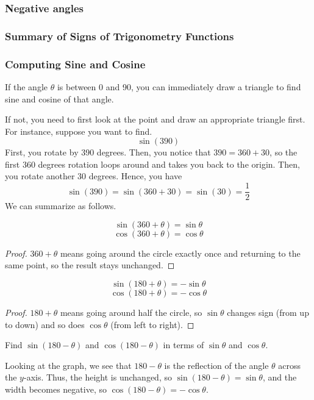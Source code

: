 \begin{frame}
\frametitle{Negative angles}
\end{frame}

\begin{frame}
\frametitle{Summary of Signs of Trigonometry Functions}
\end{frame}

\begin{frame}
\frametitle{Computing Sine and Cosine}
If the angle $\theta$ is between 0 and 90, you can immediately draw a triangle to find sine and cosine of that angle. 
\medskip

If not, you need to first look at the point and draw an appropriate triangle first. For instance, suppose you want to find.
\[ \sin (390) \]
First, you rotate by 390 degrees. Then, you notice that $390 = 360+30$, so the first 360 degrees rotation loops around and takes you back to the origin. Then, you rotate another 30 degrees. Hence, you have
\[ \sin (390) = \sin (360+30) = \sin (30) = \frac{1}{2}\]
We can summarize as follows.
\end{frame}

\begin{frame}[t]
\begin{prop}{}{}
\[\sin (360+\theta) = \sin \theta\]
\[\cos (360+\theta) = \cos \theta\]
\end{prop} \pa

\begin{proof}
$360 + \theta$ means going around the circle exactly once and returning to the same point, so the result stays unchanged.
\end{proof}
\end{frame}

\begin{frame}[t]
\begin{prop}{}{}
\[\sin (180 + \theta) = - \sin \theta\]
\[\cos (180 + \theta) = - \cos \theta \]
\end{prop}

\begin{proof}
$180 + \theta$ means going around half the circle, so $\sin \theta$ changes sign (from up to down) and so does $\cos \theta$ (from left to right).
\end{proof}
\end{frame}

\begin{frame}[t]
\begin{ex}
Find $\sin (180 - \theta)$ and $\cos (180 - \theta)$ in terms of $\sin \theta$ and $\cos \theta$.
\end{ex}

\begin{sol}
Looking at the graph, we see that $180 - \theta$ is the reflection of the angle $\theta$ across the $y$-axis. Thus, the height is unchanged, so $\sin (180 - \theta) = \sin \theta$, and the width becomes negative, so $\cos(180 - \theta) = -\cos \theta$.
\end{sol}
\end{frame}

